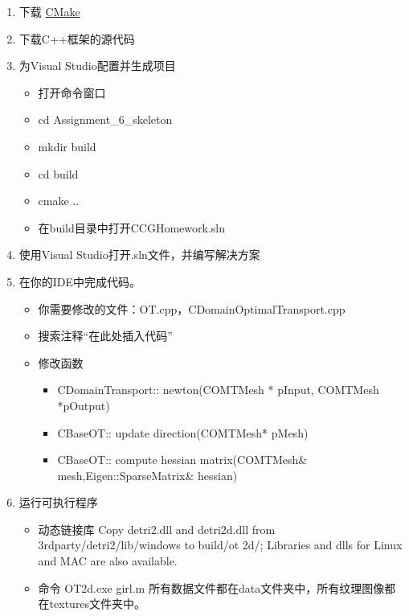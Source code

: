 \begin{enumerate}
    \item 下载 \href{https://cmake.org/download/}{CMake}
    \item 下载C++框架的源代码
    \item 为Visual Studio配置并生成项目
        \begin{itemize}
            \item 打开命令窗口
            \item cd Assignment\_6\_skeleton
            \item mkdir build
            \item cd build
            \item cmake ..
            \item 在build目录中打开CCGHomework.sln
        \end{itemize}
    \item 使用Visual Studio打开.sln文件，并编写解决方案
    \item 在你的IDE中完成代码。
        \begin{itemize}
            \item 你需要修改的文件：OT.cpp，CDomainOptimalTransport.cpp
            \item 搜索注释“在此处插入代码”
            \item 修改函数
                \begin{itemize}
                    \item CDomainTransport:: newton(COMTMesh * pInput, COMTMesh *pOutput)
                    \item CBaseOT:: update direction(COMTMesh* pMesh)
                    \item CBaseOT:: compute hessian matrix(COMTMesh\& mesh,Eigen::SparseMatrix\& hessian)
                \end{itemize}
        \end{itemize}
    \item 运行可执行程序
        \begin{itemize}
            \item 动态链接库
            Copy detri2.dll and detri2d.dll from 3rdparty/detri2/lib/windows to build/ot 2d/; Libraries and dlls for Linux and MAC are also available.
            \item 命令
            OT2d.exe girl.m
            所有数据文件都在data文件夹中，所有纹理图像都在textures文件夹中。
        \end{itemize}
\end{enumerate}



